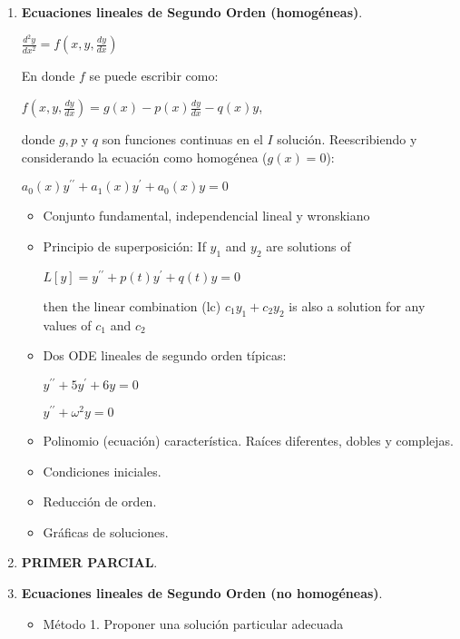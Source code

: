 \documentclass[twoside, twocolumn, 10pt]{article}
\begin{document}
{\begin{small}
\begin{enumerate}
\item \textbf{Ecuaciones lineales de Segundo Orden (homogéneas)}. 
    \begin{center}
    $\frac{d^{2}y}{dx^{2}}=f(x,y,\frac{dy}{dx})$ 
    \end{center}

    En donde $f$ se puede escribir como:

    \begin{center}
    $f(x,y,\frac{dy}{dx})=g(x)-p(x)\frac{dy}{dx}-q(x)y$, 
    \end{center}
    donde
    $g,p$ y $q$ son funciones continuas en el $I$ solución.
    Reescribiendo y considerando la ecuación como homogénea ($g(x)=0$): 
    \begin{center}
    $a_{0}(x)y^{\prime\prime} + a_{1}(x)y^{\prime} + a_{0}(x)y = 0$
    \end{center}
\begin{itemize}
    \item Conjunto fundamental, independencial lineal y wronskiano
    \item Principio de superposición:
        If $y_{1}$ and $y_{2}$ are solutions of 
        \begin{center}
        $L[y]=y^{\prime\prime} + p(t)y^{\prime} + q(t)y=0$
        \end{center}
        then the linear combination (lc) $c_{1}y_{1}+c_{2}y_{2}$ is also a
        solution for any values of $c_{1}$ and $c_{2}$

    \item Dos ODE lineales de segundo orden típicas:
    \begin{center}
        $y^{\prime\prime}+5y^{\prime}+6y=0$ 

        $y^{\prime\prime}+\omega^{2}y=0$
    \end{center}
    \item Polinomio (ecuación) característica. Raíces diferentes, dobles y complejas.
    \item Condiciones iniciales.
    \item Reducción de orden.
    \item Gráficas de soluciones.



\end{itemize} 
\item \textbf{PRIMER PARCIAL}. 
\item \textbf{Ecuaciones lineales de Segundo Orden (no homogéneas)}. 
\begin{itemize}
    \item Método 1. Proponer una solución particular adecuada

\end{itemize}
\end{enumerate}
%
%
 \vspace{.1cm} 
\end{small}}
 
\end{document}
